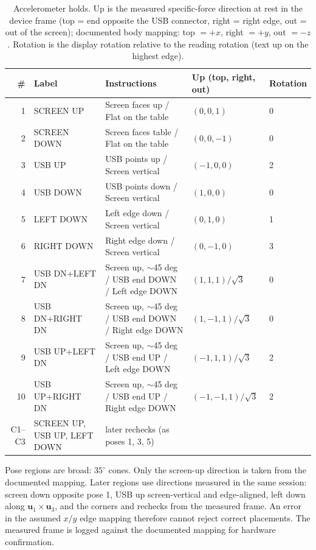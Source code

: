 \documentclass[conference]{IEEEtran}
\begin{document}
    \begin{table}[t]
        \centering
        \caption{Accelerometer holds. Up is the measured specific-force
        direction at rest in the device frame (top = end opposite the USB
        connector, right = right edge, out = out of the screen); documented
        body mapping: top $=+x$, right $=+y$, out $=-z$. Rotation is the
        display rotation relative to the reading rotation (text up on the
        highest edge).}
        \label{tab:poses}
        \renewcommand{\arraystretch}{1.1}
        \begin{tabular}{@{}rllll@{}}
            \toprule
            \# & Label & Instructions & Up (top, right, out) & Rotation \\
            \midrule
            1 & SCREEN UP & Screen faces up / Flat on the table & $(0,0,1)$ & 0 \\
            2 & SCREEN DOWN & Screen faces table / Flat on the table & $(0,0,-1)$ & 0 \\
            3 & USB UP & USB points up / Screen vertical & $(-1,0,0)$ & 2 \\
            4 & USB DOWN & USB points down / Screen vertical & $(1,0,0)$ & 0 \\
            5 & LEFT DOWN & Left edge down / Screen vertical & $(0,1,0)$ & 1 \\
            6 & RIGHT DOWN & Right edge down / Screen vertical & $(0,-1,0)$ & 3 \\
            7 & USB DN+LEFT DN & Screen up, $\sim$45 deg / USB end DOWN / Left edge DOWN & $(1,1,1)/\sqrt3$ & 0 \\
            8 & USB DN+RIGHT DN & Screen up, $\sim$45 deg / USB end DOWN / Right edge DOWN & $(1,-1,1)/\sqrt3$ & 0 \\
            9 & USB UP+LEFT DN & Screen up, $\sim$45 deg / USB end UP / Left edge DOWN & $(-1,1,1)/\sqrt3$ & 2 \\
            10 & USB UP+RIGHT DN & Screen up, $\sim$45 deg / USB end UP / Right edge DOWN & $(-1,-1,1)/\sqrt3$ & 2 \\
            \midrule
            C1--C3 & SCREEN UP, USB UP, LEFT DOWN & later rechecks (as poses 1, 3, 5) & & \\
            \bottomrule
        \end{tabular}
    \end{table}

    Pose regions are broad: $35^\circ$ cones. Only the screen-up direction
    is taken from the documented mapping. Later regions use directions
    measured in the same session: screen down opposite pose 1, USB up
    screen-vertical and edge-aligned, left down along
    $\mathbf{u}_1\times\mathbf{u}_3$, and the corners and rechecks from the
    measured frame. An error in the assumed $x/y$ edge mapping therefore
    cannot reject correct placements. The measured frame is logged against
    the documented mapping for hardware confirmation.
\end{document}
